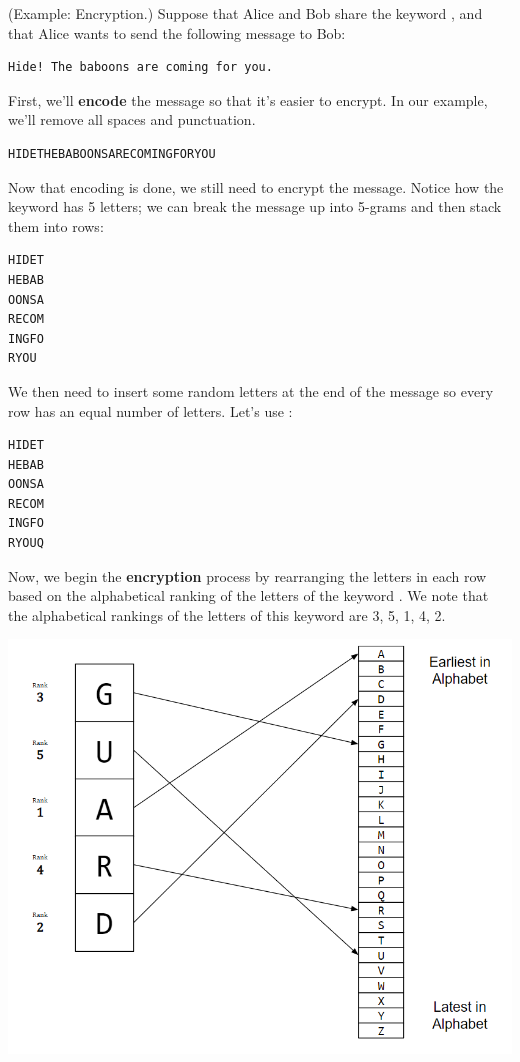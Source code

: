 \documentclass[letterpaper]{article}
\begin{document}
\begin{mdframed}[]
    (Example: Encryption.) Suppose that Alice and Bob share the keyword , and that Alice wants to send the following message to Bob: 
    \begin{mdframed}
        \begin{verbatim}
Hide! The baboons are coming for you. \end{verbatim}
    \end{mdframed}

    First, we'll \textbf{encode} the message so that it's easier to encrypt. In our example, we'll remove all spaces and punctuation. 
    \begin{mdframed}
        \begin{verbatim}
HIDETHEBABOONSARECOMINGFORYOU \end{verbatim}
    \end{mdframed}
    Now that encoding is done, we still need to encrypt the message. Notice how the keyword  has 5 letters; we can break the message up into 5-grams and then stack them into rows:
    \begin{mdframed}
        \begin{verbatim}
HIDET
HEBAB
OONSA
RECOM
INGFO
RYOU\end{verbatim}
    \end{mdframed}
    We then need to insert some random letters at the end of the message so every row has an equal number of letters. Let's use :
    \begin{mdframed}
        \begin{verbatim}
HIDET
HEBAB
OONSA
RECOM
INGFO
RYOUQ\end{verbatim}
    \end{mdframed}
    Now, we begin the \textbf{encryption} process by rearranging the letters in each row based on the alphabetical ranking of the letters of the keyword . We note that the alphabetical rankings of the letters of this keyword are 3, 5, 1, 4, 2. 
    \begin{center}
        \includegraphics[scale=0.9]{../assets/rank_crypto.png}

\end{center}
\end{mdframed}
\end{document}
